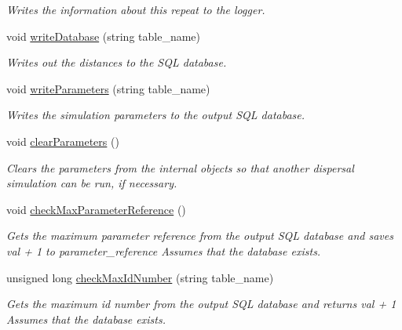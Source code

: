 \begin{DoxyCompactItemize}
\begin{DoxyCompactList}\small\item\em Writes the information about this repeat to the logger. \end{DoxyCompactList}\item 
void \hyperlink{class_simulate_dispersal_af7d0a726cb3724c159ca46f4586a8bd3}{write\+Database} (string table\+\_\+name)
\begin{DoxyCompactList}\small\item\em Writes out the distances to the S\+QL database. \end{DoxyCompactList}\item 
void \hyperlink{class_simulate_dispersal_ae0afed6eeb06f5bae4ee13a24850c8c5}{write\+Parameters} (string table\+\_\+name)
\begin{DoxyCompactList}\small\item\em Writes the simulation parameters to the output S\+QL database. \end{DoxyCompactList}\item 
void \hyperlink{class_simulate_dispersal_ae7e23b11a811ec48f2e08d9fa8ad151a}{clear\+Parameters} ()\hypertarget{class_simulate_dispersal_ae7e23b11a811ec48f2e08d9fa8ad151a}{}\label{class_simulate_dispersal_ae7e23b11a811ec48f2e08d9fa8ad151a}

\begin{DoxyCompactList}\small\item\em Clears the parameters from the internal objects so that another dispersal simulation can be run, if necessary. \end{DoxyCompactList}\item 
void \hyperlink{class_simulate_dispersal_a0dee5d1529bd7ee6f382f7cd1b5393e5}{check\+Max\+Parameter\+Reference} ()\hypertarget{class_simulate_dispersal_a0dee5d1529bd7ee6f382f7cd1b5393e5}{}\label{class_simulate_dispersal_a0dee5d1529bd7ee6f382f7cd1b5393e5}

\begin{DoxyCompactList}\small\item\em Gets the maximum parameter reference from the output S\+QL database and saves val + 1 to parameter\+\_\+reference Assumes that the database exists. \end{DoxyCompactList}\item 
unsigned long \hyperlink{class_simulate_dispersal_abafd3fc30df157d12e462c4b1907d8fa}{check\+Max\+Id\+Number} (string table\+\_\+name)
\begin{DoxyCompactList}\small\item\em Gets the maximum id number from the output S\+QL database and returns val + 1 Assumes that the database exists. \end{DoxyCompactList}\end{DoxyCompactItemize}
